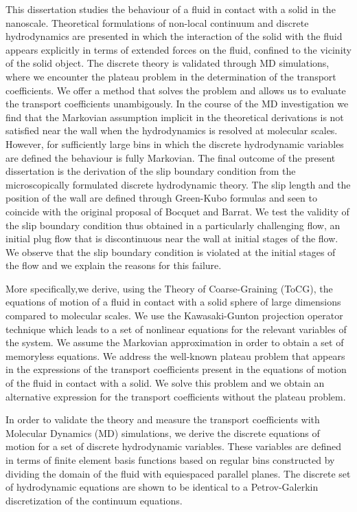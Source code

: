 \documentclass[b5paper,openright,10pt]{book}
\begin{document}
This dissertation studies the behaviour of a fluid in contact with a solid in the nanoscale. Theoretical formulations of non-local continuum and discrete hydrodynamics are presented in which the interaction of the solid with the fluid appears explicitly in terms of extended forces on the fluid, confined to the vicinity of the solid object. The discrete theory is validated through MD simulations, where we encounter the plateau problem in the determination of the transport coefficients. We offer a method that solves the problem and allows us to evaluate the transport coefficients unambigously. In the course of the MD investigation we find that the Markovian assumption implicit in the theoretical derivations is not satisfied near the wall when the hydrodynamics is resolved at molecular scales. However, for sufficiently large bins in which the discrete hydrodynamic variables are defined the behaviour is fully Markovian. The final outcome of the present dissertation is the derivation of the slip boundary condition from the microscopically formulated discrete hydrodynamic theory. The slip length and the position of the wall are defined through Green-Kubo formulas and seen to coincide with the original proposal of Bocquet and Barrat. We test the validity of the slip boundary condition thus obtained in a particularly challenging flow, an initial plug flow that is discontinuous near the wall at initial stages of the flow. We observe that the slip boundary condition is violated at the initial stages of the flow and we explain the reasons for this failure.

More specifically,we derive, using the Theory of Coarse-Graining (ToCG), the equations of motion of a fluid in contact with a solid sphere of large dimensions compared to molecular scales. 
We use the Kawasaki-Gunton projection operator technique which leads to a set of nonlinear equations for the relevant variables of the system. We assume the Markovian approximation in order to obtain a set of memoryless equations.
We address the well-known plateau problem  that appears in the expressions of the transport coefficients present in the equations of motion of the fluid in contact with a solid. 
We solve this problem and we obtain an alternative expression for the transport coefficients without the plateau problem. 

In order to validate the theory and measure the transport coefficients with Molecular Dynamics (MD) simulations, we derive the discrete equations of motion for a set of discrete hydrodynamic variables. 
These variables are defined in terms of finite element basis functions based on regular bins constructed by dividing the domain of the fluid with equiespaced parallel planes. The discrete set of hydrodynamic equations are shown to be identical to a Petrov-Galerkin discretization of the continuum equations.
\end{document}
